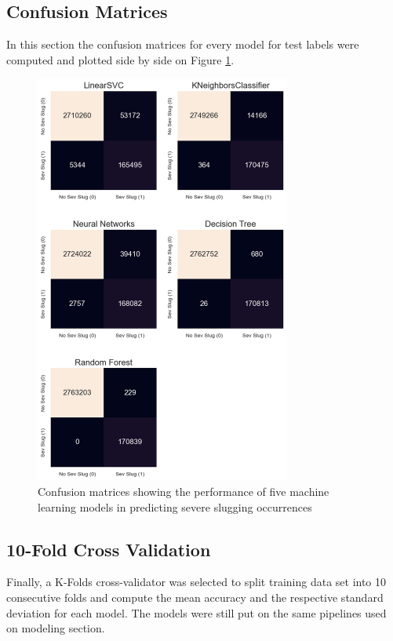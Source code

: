 \documentclass{article}
\begin{document}
\subsection{Confusion Matrices}
In this section the confusion matrices for every model for test labels were computed and plotted side by side on Figure \ref{fig:confusion_matrices}.

\begin{figure}
\centering
\includegraphics[width=0.75\textwidth]{confusion_matrices.png}
\caption{\label{fig:confusion_matrices}Confusion matrices showing the performance of five machine learning models in predicting severe slugging occurrences}
\end{figure}

\subsection{10-Fold Cross Validation}
Finally, a K-Folds cross-validator was selected to split training data set into 10 consecutive folds and compute the mean accuracy and the respective standard deviation for each model. The models were still put on the same pipelines used on modeling section.
\end{document}
